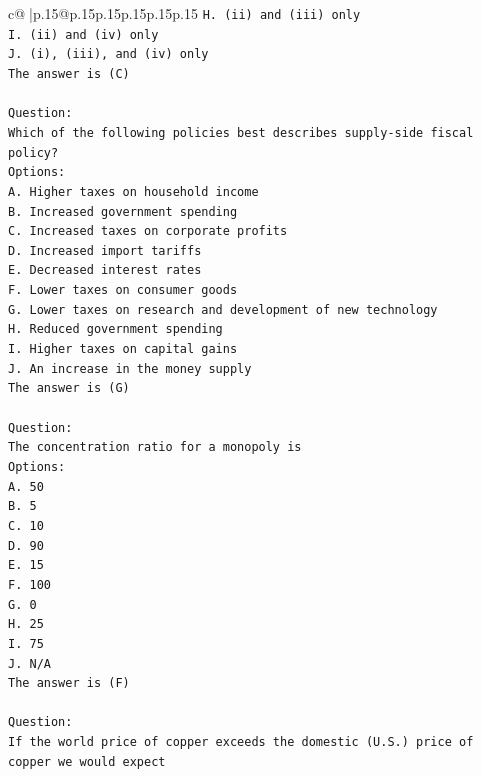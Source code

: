 \documentclass{article}
\begin{document}
{\begin{supertabular}{c@{$\;$}|p{.15\linewidth}@{}p{.15\linewidth}p{.15\linewidth}p{.15\linewidth}p{.15\linewidth}p{.15\linewidth}}
{{{\texttt{H. (ii) and (iii) only} \\
\texttt{I. (ii) and (iv) only} \\
\texttt{J. (i), (iii), and (iv) only} \\
\texttt{The answer is (C)} \\
\\ 
\texttt{Question:} \\
\texttt{Which of the following policies best describes supply{-}side fiscal policy?} \\
\texttt{Options:} \\
\texttt{A. Higher taxes on household income} \\
\texttt{B. Increased government spending} \\
\texttt{C. Increased taxes on corporate profits} \\
\texttt{D. Increased import tariffs} \\
\texttt{E. Decreased interest rates} \\
\texttt{F. Lower taxes on consumer goods} \\
\texttt{G. Lower taxes on research and development of new technology} \\
\texttt{H. Reduced government spending} \\
\texttt{I. Higher taxes on capital gains} \\
\texttt{J. An increase in the money supply} \\
\texttt{The answer is (G)} \\
\\ 
\texttt{Question:} \\
\texttt{The concentration ratio for a monopoly is} \\
\texttt{Options:} \\
\texttt{A. 50} \\
\texttt{B. 5} \\
\texttt{C. 10} \\
\texttt{D. 90} \\
\texttt{E. 15} \\
\texttt{F. 100} \\
\texttt{G. 0} \\
\texttt{H. 25} \\
\texttt{I. 75} \\
\texttt{J. N/A} \\
\texttt{The answer is (F)} \\
\\ 
\texttt{Question:} \\
\texttt{If the world price of copper exceeds the domestic (U.S.) price of copper we would expect} \\
}}}
\end{supertabular}}
\end{document}
